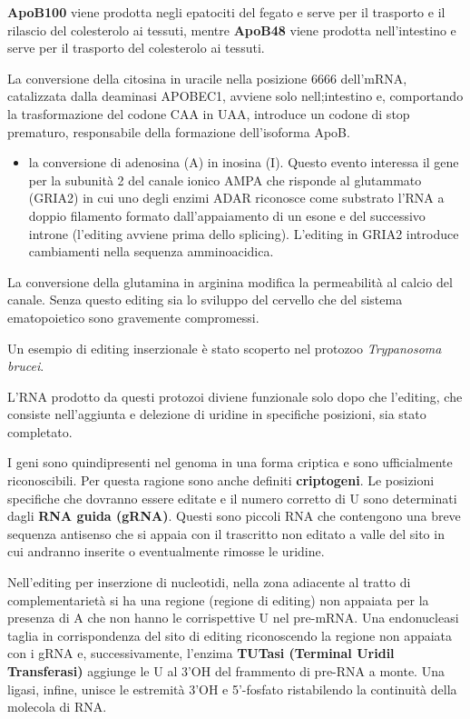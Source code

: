 \documentclass[]{article}
\begin{document}
\textbf{ApoB100} viene prodotta negli epatociti del fegato e serve per
il trasporto e il rilascio del colesterolo ai tessuti, mentre
\textbf{ApoB48} viene prodotta nell'intestino e serve per il trasporto
del colesterolo ai tessuti.

La conversione della citosina in uracile nella posizione 6666 dell'mRNA,
catalizzata dalla deaminasi APOBEC1, avviene solo nell;intestino e,
comportando la trasformazione del codone CAA in UAA, introduce un codone
di stop prematuro, responsabile della formazione dell'isoforma ApoB.

\begin{itemize}
\itemsep1pt\parskip0pt
\item
  la conversione di adenosina (A) in inosina (I). Questo evento
  interessa il gene per la subunità 2 del canale ionico AMPA che
  risponde al glutammato (GRIA2) in cui uno degli enzimi ADAR riconosce
  come substrato l'RNA a doppio filamento formato dall'appaiamento di un
  esone e del successivo introne (l'editing avviene prima dello
  splicing). L'editing in GRIA2 introduce cambiamenti nella sequenza
  amminoacidica.
\end{itemize}

La conversione della glutamina in arginina modifica la permeabilità al
calcio del canale. Senza questo editing sia lo sviluppo del cervello che
del sistema ematopoietico sono gravemente compromessi.

Un esempio di editing inserzionale è stato scoperto nel protozoo
\emph{Trypanosoma brucei}.

L'RNA prodotto da questi protozoi diviene funzionale solo dopo che
l'editing, che consiste nell'aggiunta e delezione di uridine in
specifiche posizioni, sia stato completato.

I geni sono quindipresenti nel genoma in una forma criptica e sono
ufficialmente riconoscibili. Per questa ragione sono anche definiti
\textbf{criptogeni}. Le posizioni specifiche che dovranno essere editate
e il numero corretto di U sono determinati dagli \textbf{RNA guida
(gRNA)}. Questi sono piccoli RNA che contengono una breve sequenza
antisenso che si appaia con il trascritto non editato a valle del sito
in cui andranno inserite o eventualmente rimosse le uridine.

Nell'editing per inserzione di nucleotidi, nella zona adiacente al
tratto di complementarietà si ha una regione (regione di editing) non
appaiata per la presenza di A che non hanno le corrispettive U nel
pre-mRNA. Una endonucleasi taglia in corrispondenza del sito di editing
riconoscendo la regione non appaiata con i gRNA e, successivamente,
l'enzima \textbf{TUTasi (Terminal Uridil Transferasi)} aggiunge le U al
3'OH del frammento di pre-RNA a monte. Una ligasi, infine, unisce le
estremità 3'OH e 5'-fosfato ristabilendo la continuità della molecola di
RNA.
\end{document}

